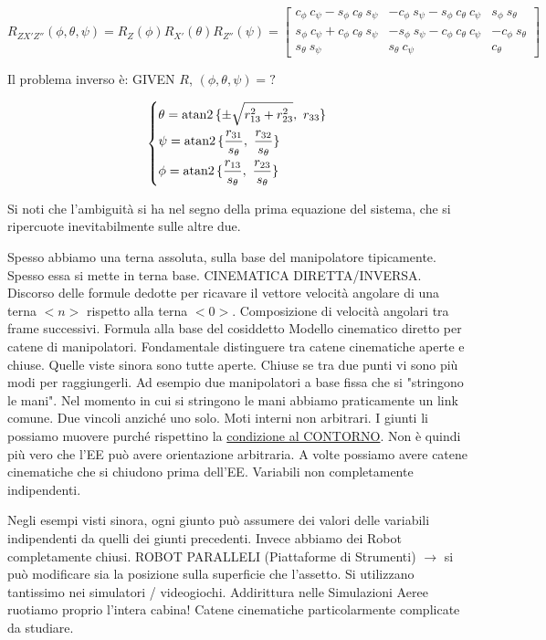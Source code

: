 \[
	R_{ZX'Z''}(\phi,\theta,\psi) = R_Z(\phi)R_{X'}(\theta)R_{Z''}(\psi) = \begin{bmatrix}c_\phi\ c_\psi-s_\phi\ c_\theta\ s_\psi&-c_\phi\ s_\psi-s_\phi\ c_\theta\ c_\psi&s_\phi\ s_\theta\\s_\phi\ c_\psi+c_\phi\ c_\theta\ s_\psi&-s_\phi\ s_\psi - c_\phi\ c_\theta\ c_\psi&-c_\phi\ s_\theta\\s_\theta\ s_\psi&s_\theta\ c_\psi&c_\theta\end{bmatrix}
\]

Il problema inverso è: GIVEN $R$, $(\phi,\theta,\psi)=?$

\[
	\left\{
	\begin{aligned}
	&\theta = \atan2{\{\pm\sqrt{r_{13}^2+r_{23}^2},\ r_{33}\}}\\
	&\psi = \atan2{\{\frac{r_{31}}{s_\theta},\ \frac{r_{32}}{s_\theta}\}}\\
	&\phi = \atan2{\{\frac{r_{13}}{s_\theta},\ \frac{r_{23}}{s_\theta}\}}
	\end{aligned}
	\right.
\]

Si noti che l'ambiguità si ha nel segno della prima equazione del sistema, che si ripercuote inevitabilmente sulle altre due.

Spesso abbiamo una terna assoluta, sulla base del manipolatore tipicamente. Spesso essa si mette in terna base. CINEMATICA DIRETTA/INVERSA. Discorso delle formule dedotte per ricavare il vettore velocità angolare di una terna $<n>$ rispetto alla terna $<0>$. Composizione di velocità angolari tra frame successivi. Formula alla base del cosiddetto Modello cinematico diretto per catene di manipolatori.
Fondamentale distinguere tra catene cinematiche aperte e chiuse. Quelle viste sinora sono tutte aperte. Chiuse se tra due punti vi sono più modi per raggiungerli. Ad esempio due manipolatori a base fissa che si "stringono le mani". Nel momento in cui si stringono le mani abbiamo praticamente un link comune. Due vincoli anziché uno solo. Moti interni non arbitrari. I giunti li possiamo muovere purché rispettino la \underline{condizione al CONTORNO}. Non è quindi più vero che l'EE può avere orientazione arbitraria. A volte possiamo avere catene cinematiche che si chiudono prima dell'EE. Variabili non completamente indipendenti.

Negli esempi visti sinora, ogni giunto può assumere dei valori delle variabili indipendenti da quelli dei giunti precedenti. Invece abbiamo dei Robot completamente chiusi. ROBOT PARALLELI (Piattaforme di Strumenti) $\rightarrow$ si può modificare sia la posizione sulla superficie che l'assetto. Si utilizzano tantissimo nei simulatori / videogiochi. Addirittura nelle Simulazioni Aeree ruotiamo proprio l'intera cabina! Catene cinematiche particolarmente complicate da studiare.

